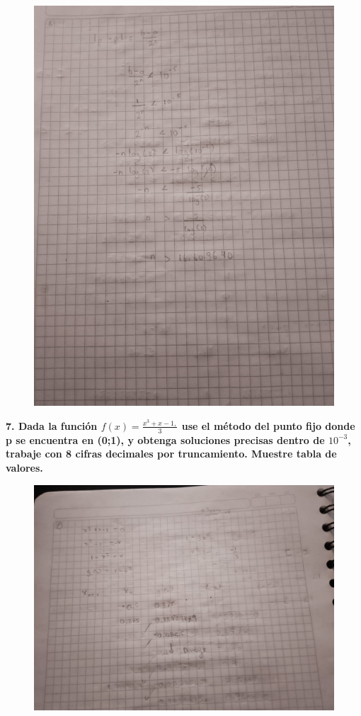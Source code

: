 \documentclass[12pt]{article}
\begin{document}
\begin{figure}[H]
\centering
\includegraphics[width=1\textwidth]{./inFiles/Figures/5.jpeg}
\end{figure}





\textbf{7. Dada la función $f(x) = \frac{x^3+x-1,}{3}$ use el método del punto fijo donde p se encuentra en (0;1), y obtenga soluciones precisas dentro de $10^{-3}$, trabaje con 8 cifras decimales por truncamiento. Muestre tabla de valores.} 


\begin{figure}[H]
\centering
\includegraphics[width=1\textwidth]{./inFiles/Figures/4.jpeg}
\end{figure}
\end{document}
